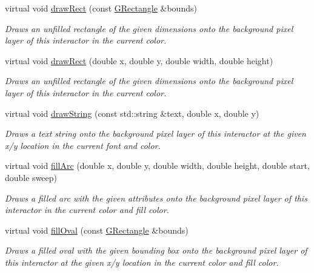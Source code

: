 \begin{DoxyCompactItemize}
virtual void \mbox{\hyperlink{classsgl_1_1GDrawingSurface_a3dd4cc5891149dfc36746264f7289877}{draw\+Rect}} (const \mbox{\hyperlink{structsgl_1_1GRectangle}{G\+Rectangle}} \&bounds)
\begin{DoxyCompactList}\small\item\em Draws an unfilled rectangle of the given dimensions onto the background pixel layer of this interactor in the current color. \end{DoxyCompactList}\item 
virtual void \mbox{\hyperlink{classsgl_1_1GDrawingSurface_a4148e770ffc5474153aadd4814dbd708}{draw\+Rect}} (double x, double y, double width, double height)
\begin{DoxyCompactList}\small\item\em Draws an unfilled rectangle of the given dimensions onto the background pixel layer of this interactor in the current color. \end{DoxyCompactList}\item 
virtual void \mbox{\hyperlink{classsgl_1_1GDrawingSurface_ad4e8551a753a77135792bbee97013675}{draw\+String}} (const std\+::string \&text, double x, double y)
\begin{DoxyCompactList}\small\item\em Draws a text string onto the background pixel layer of this interactor at the given x/y location in the current font and color. \end{DoxyCompactList}\item 
virtual void \mbox{\hyperlink{classsgl_1_1GDrawingSurface_a228075ad18bd97b57f9956568c4773f3}{fill\+Arc}} (double x, double y, double width, double height, double start, double sweep)
\begin{DoxyCompactList}\small\item\em Draws a filled arc with the given attributes onto the background pixel layer of this interactor in the current color and fill color. \end{DoxyCompactList}\item 
virtual void \mbox{\hyperlink{classsgl_1_1GDrawingSurface_a1ea6e48d59fb588797dba4deab1397e0}{fill\+Oval}} (const \mbox{\hyperlink{structsgl_1_1GRectangle}{G\+Rectangle}} \&bounds)
\begin{DoxyCompactList}\small\item\em Draws a filled oval with the given bounding box onto the background pixel layer of this interactor at the given x/y location in the current color and fill color. \end{DoxyCompactList}\item 

\end{DoxyCompactItemize}
